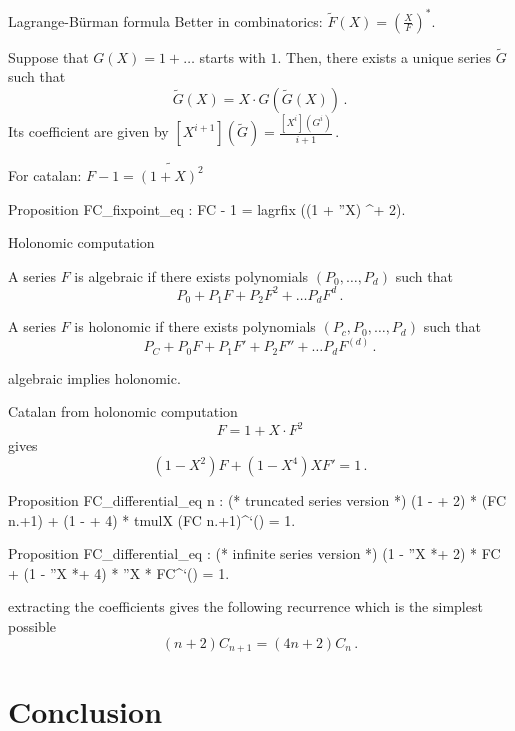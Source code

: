 \documentclass[compress,11pt]{beamer}
\renewcommand{\emph}[1]{{\color{red} #1}}
\begin{document}
\begin{frame}[fragile]{Lagrange-Bürman formula}
  Better in combinatorics: $\tilde F(X) = \left(\frac{X}{F}\right)^*$.
  \begin{THEO}
    Suppose that $G(X)=1 + \dots$ starts with $1$.
    Then, there exists a unique series $\tilde G$ such that
    \[ \tilde G(X) = X\cdot G(\tilde G(X))\,.\]
    Its coefficient are given by 
    $\displaystyle[X^{i+1}](\tilde G) = \frac{[X^{i}](G^{i})}{i+1}\,.$
  \end{THEO}
  For catalan: $F - 1= \widetilde{(1 + X)^2}$
  \begin{coqcode}
Proposition FC_fixpoint_eq : FC - 1 = lagrfix ((1 + ''X) ^+ 2).
  \end{coqcode}
\end{frame}

\begin{frame}[fragile]{Holonomic computation}
  \begin{DEFN}
    A series $F$ is \emph{algebraic} if there exists polynomials
    $(P_0, \dots, P_d)$ such that
    \[P_0 + P_1 F + P_2 F^2 + \dots P_d F^d\,.\]

    A series $F$ is \emph{holonomic} if there exists polynomials
    $(P_c, P_0, \dots, P_d)$ such that
    \[P_C + P_0 F + P_1 F' + P_2 F'' + \dots P_d F^{(d)}\,.\]

  \end{DEFN}
  \begin{theorem}
    algebraic implies holonomic.
  \end{theorem}
\end{frame}

\begin{frame}[fragile]{Catalan from holonomic computation}
  \[F = 1 + X \cdot F ^2\]
  gives
  \[(1 - X^2) F + (1 - X^4) X F' = 1\,.\]
  \begin{coqcode}
Proposition FC_differential_eq n :     (* truncated series version *)
   (1 - \X *+ 2) * (FC n.+1) + (1 - \X *+ 4) * tmulX (FC n.+1)^`() = 1.

Proposition FC_differential_eq :       (* infinite series version *)
  (1 - ''X *+ 2) * FC + (1 - ''X *+ 4) * ''X * FC^`() = 1.
  \end{coqcode}
  extracting the coefficients gives
  the following recurrence which is the simplest possible
  \[(n+2) C_{n+1} = (4n + 2) C_{n}\,.\]
\end{frame}

\section{Conclusion}
\end{document}
